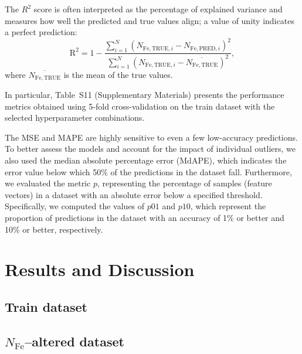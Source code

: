 \documentclass[a4paper,fleqn]{cas-sc}
\begin{document}
The $R^2$ score is often interpreted as the percentage of explained variance
and measures how well the predicted and true values align; a value of unity indicates a perfect prediction:
\begin{equation}
\label{eq5}
    \mathrm{R}^2 = 1-\frac{\displaystyle\sum_{i=1}^{N} (N_{\mathrm{Fe,TRUE},i}-N_{\mathrm{Fe,PRED},i})^2}
    {\displaystyle\sum_{i=1}^{N} (N_{\mathrm{Fe,TRUE},i}-\overline{N_\mathrm{Fe,TRUE}})^2},
\end{equation}
where $\overline{N_\mathrm{Fe,TRUE}}$ is the mean of the true values.

In particular, Table~S11 (Supplementary Materials) presents the performance metrics obtained
using 5-fold cross-validation on the train dataset with the selected hyperparameter combinations.


The MSE and MAPE are highly sensitive to even a few low-accuracy predictions.
To better assess the models and account for the impact of individual outliers, we also used the median absolute percentage error (MdAPE),
which indicates the error value below which 50\% of the predictions in the dataset fall.
Furthermore, we evaluated the metric $p$, representing the percentage of samples (feature vectors) in a dataset with an absolute error below a specified threshold.
Specifically, we computed the values of $p01$ and $p10$,
which represent the proportion of predictions in the dataset with an accuracy of 1\%
or better and 10\% or better, respectively.



\section{Results and Discussion}

\subsection{Train dataset}

\subsection{$N_\mathrm{Fe}$--altered dataset}
\end{document}

